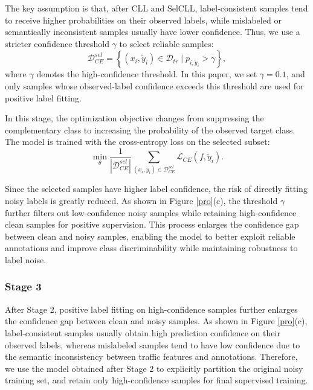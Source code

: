 \documentclass{SCIS2026}
\begin{document}
The key assumption is that, after CLL and SelCLL, label-consistent samples tend to receive higher probabilities on their observed labels, while mislabeled or semantically inconsistent samples usually have lower confidence. Thus, we use a stricter confidence threshold $\gamma$ to select reliable samples:
\begin{equation} 
	\mathcal{D}_{CE}^{sel} 
	=
	\left\{ 
	(x_i,\tilde{y}_i)\in \mathcal{D}_{tr} 
	\mid
	p_{i,\tilde{y}_i}>\gamma
	\right\}, 
	\label{eq:stage2_selected_set} 
\end{equation} 
where $\gamma$ denotes the high-confidence threshold. In this paper, we set $\gamma=0.1$, and only samples whose observed-label confidence exceeds this threshold are used for positive label fitting.

In this stage, the optimization objective changes from suppressing the complementary class to increasing the probability of the observed target class. The model is trained with the cross-entropy loss on the selected subset:
\begin{equation} 
	\min_{\theta} 
	\frac{1}{|\mathcal{D}_{CE}^{sel}|} 
	\sum_{(x_i,\tilde{y}_i)\in \mathcal{D}_{CE}^{sel}} 
	\mathcal{L}_{CE}(f,\tilde{y}_i). 
	\label{eq:stage2_ce_objective} 
\end{equation} 

Since the selected samples have higher label confidence, the risk of directly fitting noisy labels is greatly reduced. As shown in Figure \ref{pro}(c), the threshold $\gamma$ further filters out low-confidence noisy samples while retaining high-confidence clean samples for positive supervision. This process enlarges the confidence gap between clean and noisy samples, enabling the model to better exploit reliable annotations and improve class discriminability while maintaining robustness to label noise.


\subsubsection{Stage 3}
After Stage 2, positive label fitting on high-confidence samples further enlarges the confidence gap between clean and noisy samples. As shown in Figure \ref{pro}(c), label-consistent samples usually obtain high prediction confidence on their observed labels, whereas mislabeled samples tend to have low confidence due to the semantic inconsistency between traffic features and annotations. Therefore, we use the model obtained after Stage 2 to explicitly partition the original noisy training set, and retain only high-confidence samples for final supervised training.
\end{document}
